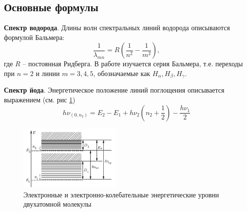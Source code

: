 \subsection*{Основные формулы}

\textbf{Спектр водорода}. 
Длины волн спектральных линий водорода описываются формулой Бальмера:
\begin{equation}\label{Balmer}
\dfrac{1}{\lambda_{mn}} = R \left( \dfrac{1}{n^2} - \dfrac{1}{m^2} \right),
\end{equation}
где $R$ -- постоянная Ридберга. 
В работе изучается серия Бальмера, т.е. переходы при $ n = 2 $ и линии $ m = 3, 4, 5$, обозначаемые как $ H_\alpha, H_\beta, H_\gamma$.
    

\textbf{Спектр йода}. 
Энергетическое положение линий поглощения описывается выражением (см. рис \ref{fig:33})
\begin{equation}\label{iod}
h\nu_{(0,n_2)} = E_2 - E_1 + h\nu_2 \left( n_2 + \dfrac{1}{2} \right) - \dfrac{h \nu_1}{2}
\end{equation}

\begin{figure}[h]
    \centering
    \includegraphics[width=0.45\textwidth]{iod.png}
    \caption{Электронные и электронно-колебательные энергетические уровни двухатомной молекулы}
    \label{fig:33}
\end{figure}
